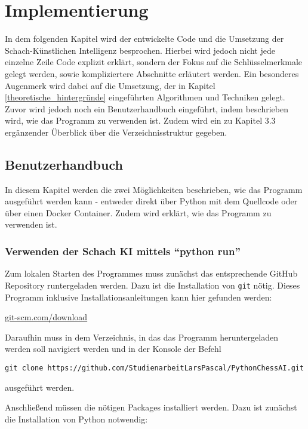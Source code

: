 
\chapter{Implementierung}
In dem folgenden Kapitel wird der entwickelte Code und die Umsetzung der Schach-Künstlichen Intelligenz besprochen. Hierbei wird jedoch nicht jede einzelne Zeile Code explizit erklärt, sondern der Fokus auf die Schlüsselmerkmale gelegt werden, sowie kompliziertere Abschnitte erläutert werden. Ein besonderes Augenmerk wird dabei auf die Umsetzung, der in Kapitel \ref{theoretische_hintergründe} eingeführten Algorithmen und Techniken gelegt. Zuvor wird jedoch noch ein Benutzerhandbuch eingeführt, indem beschrieben wird, wie das Programm zu verwenden ist. Zudem wird ein zu Kapitel 3.3 ergänzender Überblick über die Verzeichnisstruktur gegeben.

   \section{Benutzerhandbuch}\label{benutzerhandbuch}

In diesem Kapitel werden die zwei Möglichkeiten beschrieben, wie das Programm ausgeführt werden kann - entweder direkt über Python mit dem Quellcode oder über einen Docker Container. Zudem wird erklärt, wie das Programm zu verwenden ist.

\subsection{Verwenden der Schach KI mittels ``python
run''}\label{verwenden-der-schach-ki-mittels-python-run}

Zum lokalen Starten des Programmes muss zunächst das entsprechende
GitHub Repository runtergeladen werden. Dazu ist die Installation von
\texttt{git} nötig. Dieses Programm inklusive Installationsanleitungen kann hier
gefunden werden:

\href{https://git-scm.com/download/}{git-scm.com/download}

Daraufhin muss in dem Verzeichnis, in das das Programm heruntergeladen werden
soll navigiert werden und in der Konsole der Befehl

\texttt{git\ clone\ https://github.com/StudienarbeitLarsPascal/PythonChessAI.git}

ausgeführt werden.

Anschließend müssen die nötigen Packages installiert werden. Dazu ist
zunächst die Installation von Python notwendig:

